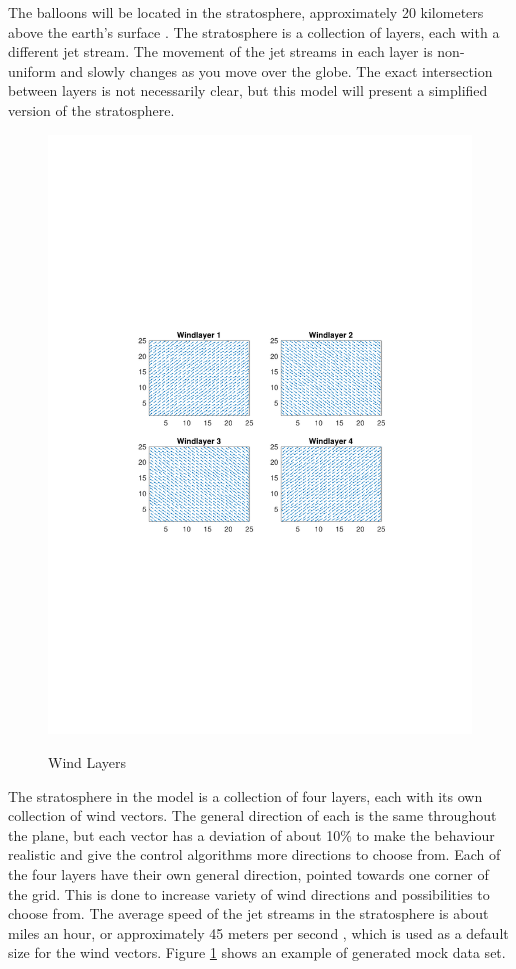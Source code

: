 The balloons will be located in the stratosphere, approximately 20 kilometers above the earth's surface \citep{}. The stratosphere is a collection of layers, each with a different jet stream. The movement of the jet streams in each layer is non-uniform and slowly changes as you move over the globe. The exact intersection between layers is not necessarily clear, but this model will present a simplified version of the stratosphere.

\begin{figure}[h]
\centering
\includegraphics[width=\textwidth, trim={4cm 10cm 4cm 9cm},clip]{graphics/WindLayers.pdf}
\label{fig:windLayers}
\caption{Wind Layers}
\end{figure}


The stratosphere in the model is a collection of four layers, each with its own collection of wind vectors. The general direction of each is the same throughout the plane, but each vector has a deviation of about 10\% to make the behaviour realistic and give the control algorithms more directions to choose from. Each of the four layers have their own general direction, pointed towards one corner of the grid. This is done to increase variety of wind directions and possibilities to choose from. The average speed of the jet streams in the stratosphere is about miles an hour, or approximately 45 meters per second \citep{Roginsky1999}, which is used as a default size for the wind vectors. Figure \ref{fig:windLayers} shows an example of generated mock data set.

